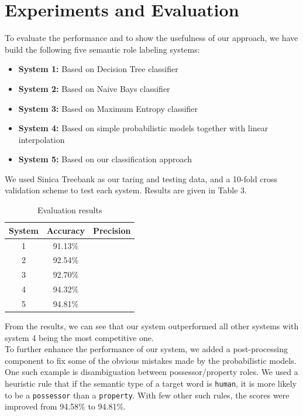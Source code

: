 \section{Experiments and Evaluation}
To evaluate the performance and to show the usefulness of our approach, we have build the following five semantic role labeling systems:
\begin{itemize}
\item \textbf{System 1:} Based on Decision Tree classifier
\item \textbf{System 2:} Based on Naive Bays classifier
\item \textbf{System 3:} Based on Maximum Entropy classifier
\item \textbf{System 4:} Based on simple probabilistic models together with linear interpolation
\item \textbf{System 5:} Based on our classification approach
\end{itemize} 
We used Sinica Treebank as our taring and testing data, and a 10-fold cross validation scheme to test each system. Results are given in Table 3. 
\begin{table}[!h]
\begin{center}
\begin{tabular}{|c|c|c|}
\hline \bf System & \bf Accuracy &  \bf Precision\\ \hline
 1 & 91.13\% &  \\ 
 2 & 92.54\% &  \\ 
 3 & 92.70\% &  \\ 
 4 & 94.32\% &  \\ 
 5 & 94.81\% &  \\ 
\hline 
\end{tabular}
\caption{Evaluation results} 
\end{center}
\end{table}
From the results, we can see that our system outperformed all other systems with system 4 being the most competitive one. \\
To further enhance the performance of our system, we added a post-processing component to fix some of the obvious mistakes made by the probabilistic models. One such example is disambiguation between possessor/property roles. We used a heuristic rule that if the semantic type of a target word is \verb+human+, it is more likely to be a \verb+possessor+ than a \verb+property+. With few other such rules, the scores were improved from 94.58\% to 94.81\%. 
